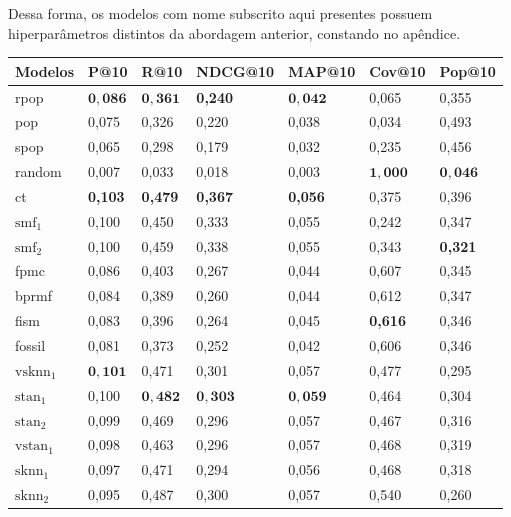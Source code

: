 Dessa forma, os modelos com nome subscrito aqui presentes possuem hiperparâmetros
distintos da abordagem anterior, constando no apêndice.

\begin{table}[htbp]
  \centering
  \begin{tabular}{|l|l|l|l|l|l|l|}
    \hline
    Modelos & P@10 & R@10 & NDCG@10 & MAP@10 & Cov@10 & Pop@10 \\
    \hline
    rpop & $\mathbf{0{,}086}$ & $\mathbf{0{,}361}$ & \textbf{0{,}240} & $\mathbf{0{,}042}$ & 0,065 & 0,355 \\
    \hline
    pop & 0,075 & 0,326 & 0,220 & 0,038 & 0,034 & 0,493 \\
    \hline
    spop & 0,065 & 0,298 & 0,179 & 0,032 & 0,235 & 0,456 \\
    \hline
    random & 0,007 & 0,033 & 0,018 & 0,003 & $\mathbf{1{,}000}$ & $\mathbf{0{,}046}$ \\
    \hline
    \hline
    ct & \textbf{0{,}103} & \textbf{0{,}479} & \textbf{0{,}367} & \textbf{0{,}056} & 0,375 & 0,396 \\
    \hline
    $\text{smf}_1$ & 0,100 & 0,450 & 0,333 & 0,055 & 0,242 & 0,347 \\
    \hline
    $\text{smf}_2$ & 0,100 & 0,459 & 0,338 & 0,055 & 0,343 &\textbf{ 0{,}321} \\
    \hline
    fpmc & 0,086 & 0,403 & 0,267 & 0,044 & 0,607 & 0,345 \\
    \hline
    bprmf & 0,084 & 0,389 & 0,260 & 0,044 & 0,612 & 0,347 \\
    \hline
    fism & 0,083 & 0,396 & 0,264 & 0,045 & \textbf{0{,}616} & 0,346 \\
    \hline
    fossil & 0,081 & 0,373 & 0,252 & 0,042 & 0,606 & 0,346 \\
    \hline
    \hline
    $\text{vsknn}_1$ & $\mathbf{0{,}101}$ & 0,471 & 0,301 & 0,057 & 0,477 & 0,295 \\
    \hline
    $\text{stan}_1$ & 0,100 & $\mathbf{0{,}482}$ & $\mathbf{0{,}303}$ & $\mathbf{0{,}059}$ & 0,464 & 0,304 \\
    \hline
    $\text{stan}_2$ & 0,099 & 0,469 & 0,296 & 0,057 & 0,467 & 0,316 \\
    \hline
    $\text{vstan}_1$ & 0,098 & 0,463 & 0,296 & 0,057 & 0,468 & 0,319 \\
    \hline
    $\text{sknn}_1$ & 0,097 & 0,471 & 0,294 & 0,056 & 0,468 & 0,318 \\
    \hline
    $\text{sknn}_2$ & 0,095 & 0,487 & 0,300 & 0,057 & 0,540 & 0,260 \\

\end{tabular}
\end{table}
